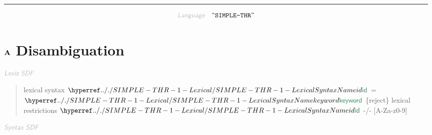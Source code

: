 

\begin{center}
\rule{3in}{0.4pt}
\end{center}

\begin{displaymath}
\KEY{Language} \quad \STRING{SIMPLE-THR}
\end{displaymath}

\section{$\SECT{A}$ Disambiguation}\hypertarget{secta-disambiguation}{}\label{secta-disambiguation}

$\KEY{Lexis SDF}$

\begin{quote}
lexical syntax\newline
     $\SHADE{\SYNHYPER{../.}{SIMPLE-THR-1-Lexical}{id}}$ = $\SHADE{\SYNHYPER{../.}{SIMPLE-THR-1-Lexical}{keyword}}$ \{reject\}\newline
   \newline
   lexical restrictions\newline
     $\SHADE{\SYNHYPER{../.}{SIMPLE-THR-1-Lexical}{id}}$ -/- {[}A-Za-z0-9{]}
\end{quote}

$\KEY{Syntax SDF}$

